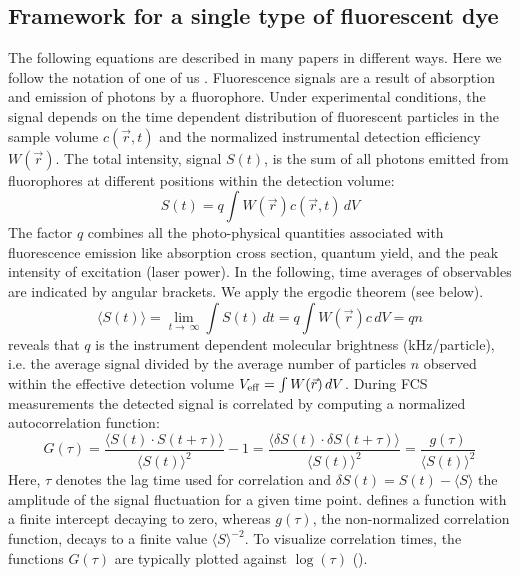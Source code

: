 \subsection{Framework for a single type of fluorescent dye}
\label{sec:theor.frame}
The following equations are described in many papers in different ways. Here we follow the notation of one of us \cite{Weidemann2009}. Fluorescence signals are a result of absorption and emission of photons by a fluorophore. Under experimental conditions, the signal depends on the time dependent distribution of fluorescent particles in the sample volume $c(\vec{r},t)$ and the normalized instrumental detection efficiency $W(\vec{r})$. The total intensity, signal $S(t)$, is the sum of all photons emitted from fluorophores at different positions within the detection volume:
	\begin{equation}
	\label{eq1}
	S(t) = q \int W(\vec{r})  c(\vec{r},t) \,dV
	\end{equation}
The factor $q$ combines all the photo-physical quantities associated with fluorescence emission like absorption cross section, quantum yield, and the peak intensity of excitation (laser power). In the following, time averages of observables are indicated by angular brackets. We apply the ergodic theorem (see below).
	\begin{equation}
	\label{eq2}
	\langle S(t) \rangle = \lim_{t\to\ \infty} \int S(t) \,dt = q \int W(\vec{r})  c \,dV = qn
	\end{equation}
 reveals that $q$ is the instrument dependent molecular brightness (kHz/particle), i.e. the average signal divided by the average number of particles $n$ observed within the effective detection volume $V_{\rm eff} = \int W(\vec{r})  \,dV$. During FCS measurements the detected signal is correlated by computing a normalized autocorrelation function: 
	\begin{equation}
	\label{eq3}
	G(\tau) = \frac{\langle S(t) \cdot S(t+\tau)\rangle}{\langle S(t) \rangle^2}-1 = \frac{\langle \delta S(t) \cdot \delta S(t+\tau)\rangle}{\langle S(t) \rangle^2} = \frac{g(\tau)}{\langle S(t) \rangle^2}
	\end{equation}
Here, $\tau$ denotes the lag time used for correlation and $\delta S(t) = S(t)-\langle S \rangle$ the amplitude of the signal fluctuation for a given time point.  defines a function with a finite intercept decaying to zero, whereas $g(\tau)$, the non-normalized correlation function, decays to a finite value $\langle S \rangle^{-2}$. To visualize correlation times, the functions $G(\tau)$ are typically plotted against $\log(\tau)$ ().


